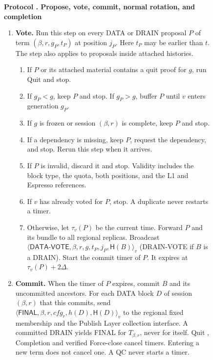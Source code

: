 \documentclass[11pt,a4paper]{article}
\newcommand{\RR}[1]{{\color{rrRed}#1}}
\newcommand{\Hash}{\mathsf H}
\newcommand{\tagg}[1]{\ensuremath{\mathsf{#1}}}
\newcounter{protocol}
\newenvironment{protocol}[3][htbp]{\begin{figure}[#1]\refstepcounter{protocol}\label{#2}
\begin{mdframed}[linewidth=.6pt,skipabove=0pt,skipbelow=0pt,
innertopmargin=7pt,innerbottommargin=7pt]\small
\textbf{Protocol \theprotocol. #3}\par\smallskip}{\end{mdframed}\end{figure}}
\begin{document}
\begin{protocol}{alg:steady}{Propose, vote, commit, normal rotation\RR{, and completion}}
\begin{enumerate}[label=\textbf{\arabic*)},itemsep=3pt]
\item \textbf{Vote.} Run this step on every DATA \RR{or DRAIN} proposal
$P$ of term $(\beta,r,g_P,t_P)$ at position $j_P$. Here $t_P$ may be earlier
than $t$. The step also applies to proposals inside attached histories.
 \begin{enumerate}[label=(\alph*)]
 \item If $P$ or its attached material contains a quit proof for $g$,
       run Quit and stop.
 \item If $g_P<g$, keep $P$ and stop. If $g_P>g$, buffer $P$
       until $v$ enters generation $g_P$.
 \item If $g$ is frozen \RR{or session $(\beta,r)$ is complete}, keep $P$ and
       stop.
 \item If a dependency is missing, keep $P$, request the dependency,
       and stop. Rerun this step when it arrives.
 \item If $P$ is invalid, discard it and stop. \RR{Validity includes the
       block type, the quota, both positions, and the L1 and Espresso references.}
 \item If $v$ has already voted for $P$, stop.
       A duplicate never restarts a timer.
 \item Otherwise, let $\tau_v(P)$ be the current time. Forward $P$ and
       its bundle to all \RR{regional replicas. }
       Broadcast
       $\langle\tagg{DATA\mbox{-}VOTE},\beta,r,g,t_P,j_P,\Hash(B)\rangle_v$
       \RR{(DRAIN-VOTE if $B$ is a DRAIN)}.
       Start the commit timer of $P$. It expires at $\tau_v(P)+2\Delta$.
 \end{enumerate}

\item \textbf{Commit.} When the timer of $P$ expires, commit $B$ and
its uncommitted ancestors. \RR{For each DATA block $D$ of session $(\beta,r)$
that this commits, send
$\langle\tagg{FINAL},\beta,r,\mathit{cfg}_r,h(D),\Hash(D)\rangle_v$ to the regional fixed membership and the Publish Layer collection interface. A committed DRAIN yields FINAL for $T_{\beta,r}$, never for
itself. } Quit \RR{, Completion and verified Force-close} cancel timers.
Entering a new term does not cancel one. A QC never starts a timer.


\end{enumerate}
\end{protocol}
\end{document}
